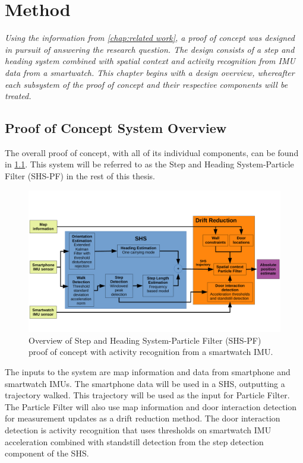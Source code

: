 \chapter{Method}
\label{chap:method}
\textit{Using the information from \cref{chap:related work}, a proof of concept was designed in pursuit of answering the research question. The design consists of a step and heading system combined with spatial context and activity recognition from IMU data from a smartwatch. This chapter begins with a design overview, whereafter each subsystem of the proof of concept and their respective components will be treated.}

\section{Proof of Concept System Overview}
The overall proof of concept, with all of its individual components, can be found in \cref{fig:system_design}. This system will be referred to as the Step and Heading System-Particle Filter (SHS-PF) in the rest of this thesis.
\begin{figure}[H]
	\centering
	\includegraphics[trim=0 40 0 70, clip, width=1.1\linewidth]{images/system_design}
	\setlength{\abovecaptionskip}{3pt}
	\setlength{\belowcaptionskip}{-20pt}
	\caption{Overview of Step and Heading System-Particle Filter (SHS-PF) proof of concept  with activity recognition from a smartwatch IMU.}
	\label{fig:system_design}
\end{figure}
The inputs to the system are map information and data from smartphone and smartwatch IMUs. The smartphone data will be used in a \ac{SHS}, outputting a trajectory walked. This trajectory will be used as the input for Particle Filter. The Particle Filter will also use map information and door interaction detection for measurement updates as a drift reduction method. The door interaction detection is activity recognition that uses thresholds on smartwatch IMU acceleration combined with standstill detection from the step detection component of the \ac{SHS}. 

